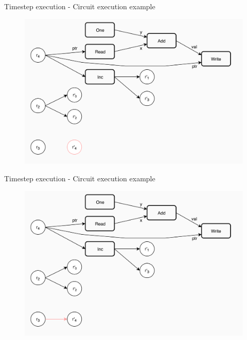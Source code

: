 \documentclass[xcolor={usenames}]{beamer}
\begin{document}
  \begin{frame}{Timestep execution - Circuit execution example}
  	\begin{figure}
  		\centering
  		\includegraphics[width=\textwidth]{../figures/example-circuit-20.png}
  	\end{figure}
  \end{frame}
  \begin{frame}{Timestep execution - Circuit execution example}
  	\begin{figure}
  		\centering
  		\includegraphics[width=\textwidth]{../figures/example-circuit-21.png}
  	\end{figure}
  \end{frame}
\end{document}
